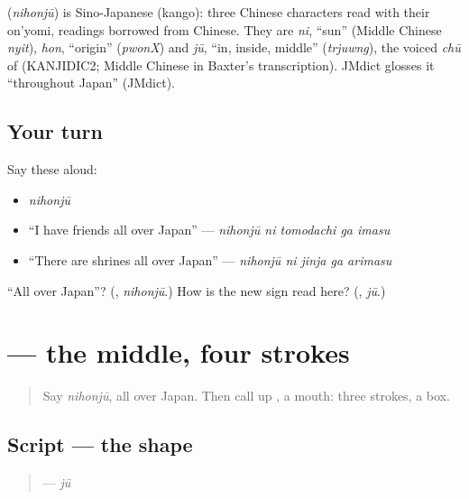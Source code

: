 \begin{cousinweb}
\textbf{} (\emph{nihonjū}) is Sino-Japanese (kango): three Chinese characters read with their on'yomi, readings borrowed from Chinese. They are \emph{ni}, \textquotedblleft{}sun\textquotedblright{} (Middle Chinese \emph{nyit}), \emph{hon}, \textquotedblleft{}origin\textquotedblright{} (\emph{pwonX}) and \emph{jū}, \textquotedblleft{}in, inside, middle\textquotedblright{} (\emph{trjuwng}), the voiced \emph{chū} of \textbf{} (KANJIDIC2; Middle Chinese in Baxter's transcription). JMdict glosses it \textquotedblleft{}throughout Japan\textquotedblright{} (JMdict).
\end{cousinweb}

\subsection*{Your turn}
Say these aloud:

\begin{itemize}
\raggedright
  \item \emph{nihonjū}
  \item \textquotedblleft{}I have friends all over Japan\textquotedblright{} — \emph{nihonjū ni tomodachi ga imasu}
  \item \textquotedblleft{}There are shrines all over Japan\textquotedblright{} — \emph{nihonjū ni jinja ga arimasu}
\end{itemize}

\begin{tcolorbox}[breakable,colback=teal!4,colframe=teal!35!black,title={Before you move on}]
\textquotedblleft{}All over Japan\textquotedblright{}? (\textbf{}, \emph{nihonjū}.) How is the new sign read here? (\textbf{}, \emph{jū}.)
\end{tcolorbox}
\section[\texorpdfstring{\ja{中} (jū)}{中 (jū)}]{ — the middle, four strokes}

\label{lesson:JA-W257-juu-kanji}



\begin{quote}
Say \emph{nihonjū}, all over Japan. Then call up \textbf{}, a mouth: three strokes, a box.
\end{quote}

\subsection*{Script — the shape}
\begin{quote}
\textbf{} — \emph{jū}
\end{quote}

